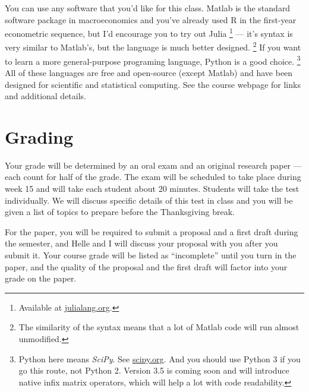 \documentclass[nofonts,nols]{tufte-handout}
\begin{document}
You can use any software that you'd like for this class.
Matlab is the standard software package in macroeconomics and you've
already used R in the first-year econometric sequence, but I'd
encourage you to try out Julia%
\footnote{Available at \url{julialang.org}.} %
--- it's syntax is very similar to
Matlab's, but the language is much better designed.%
\footnote{The similarity of the syntax means that a lot of Matlab code
  will run almost unmodified.} %
If you want to learn a more general-purpose programing language,
Python is a good choice.%
\footnote{Python here means \emph{SciPy}. See
  \url{scipy.org}. And you should use Python 3 if you go this
  route, not Python 2. Version 3.5 is coming soon and will introduce
  native infix matrix operators, which will help a lot with code
  readability.} %
All of these languages are free and open-source (except Matlab) and
have been designed for scientific and statistical computing. See the
course webpage for links and additional details.

\section{Grading}
Your grade will be determined by an oral exam and an original research
paper --- each count for half of the grade. The exam will be scheduled
to take place during week 15 and will take each student about 20
minutes. Students will take the test individually. We will discuss
specific details of this test in class and you will be given a list of
topics to prepare before the Thanksgiving break.

For the paper, you will be required to submit a proposal and a first
draft during the semester, and Helle and I will discuss your proposal
with you after you submit it. Your course grade will be listed as
``incomplete'' until you turn in the paper, and the quality of the
proposal and the first draft will factor into your grade on the paper.
\end{document}

